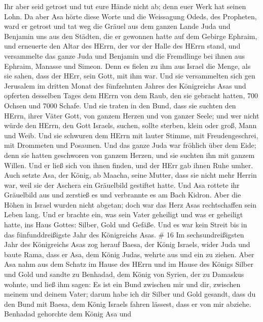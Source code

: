  Ihr aber seid getrost und tut eure Hände nicht ab; denn
euer Werk hat seinen Lohn.  Da aber Asa hörte diese Worte
und die Weissagung Odeds, des Propheten, ward er getrost und tat weg die
Gräuel aus dem ganzen Lande Juda und Benjamin uns aus den Städten, die
er gewonnen hatte auf dem Gebirge Ephraim, und erneuerte den Altar des
HErrn, der vor der Halle des HErrn stand,  und versammelte
das ganze Juda und Benjamin und die Fremdlinge bei ihnen aus Ephraim,
Manasse und Simeon. Denn es fielen zu ihm aus Israel die Menge, als sie
sahen, dass der HErr, sein Gott, mit ihm war.  Und sie
versammelten sich gen Jerusalem im dritten Monat des fünfzehnten Jahres
des Königreichs Asas  und opferten desselben Tages dem
HErrn von dem Raub, den sie gebracht hatten, 700 Ochsen und 7000 Schafe.
 Und sie traten in den Bund, dass sie suchten den HErrn,
ihrer Väter Gott, von ganzem Herzen und von ganzer Seele; 
und wer nicht würde den HErrn, den Gott Israels, suchen, sollte sterben,
klein oder groß, Mann und Weib.  Und sie schwuren dem HErrn
mit lauter Stimme, mit Freudengeschrei, mit Drommeten und Posaunen.
 Und das ganze Juda war fröhlich über dem Eide; denn sie
hatten geschworen von ganzem Herzen, und sie suchten ihn mit ganzem
Willen. Und er ließ sich von ihnen finden, und der HErr gab ihnen Ruhe
umher.  Auch setzte Asa, der König, ab Maacha, seine
Mutter, dass sie nicht mehr Herrin war, weil sie der Aschera ein
Gräuelbild gestiftet hatte. Und Asa rottete ihr Gräuelbild aus und
zerstieß es und verbrannte es am Bach Kidron.  Aber die
Höhen in Israel wurden nicht abgetan; doch war das Herz Asas
rechtschaffen sein Leben lang.  Und er brachte ein, was
sein Vater geheiligt und was er geheiligt hatte, ins Haus Gottes:
Silber, Gold und Gefäße.  Und es war kein Streit bis in das
fünfunddreißigste Jahr des Königreichs Asas. \# 16  Im
sechsundreißigsten Jahr des Königreichs Asas zog herauf Baesa, der König
Israels, wider Juda und baute Rama, dass er Asa, dem König Judas, wehrte
aus und ein zu ziehen.  Aber Asa nahm aus dem Schatz im
Hause des HErrn und im Hause des Königs Silber und Gold und sandte zu
Benhadad, dem König von Syrien, der zu Damaskus wohnte, und ließ ihm
sagen:  Es ist ein Bund zwischen mir und dir, zwischen
meinem und deinem Vater; darum habe ich dir Silber und Gold gesandt,
dass du den Bund mit Baesa, dem König Israels fahren lässest, dass er
von mir abziehe.  Benhadad gehorchte dem König Asa und
